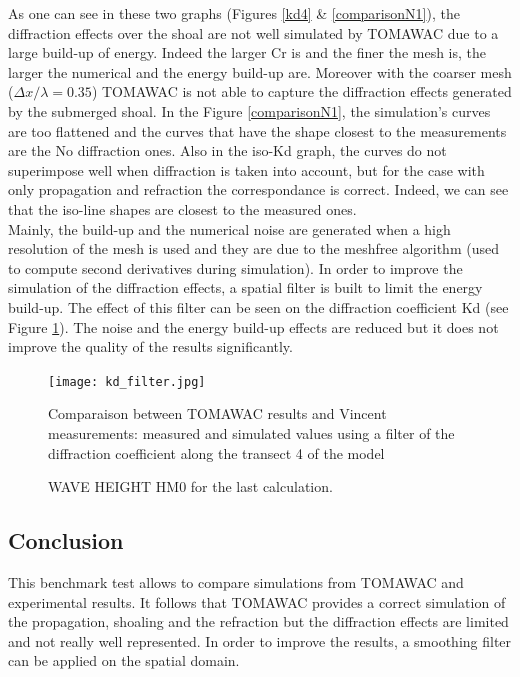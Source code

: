 As one can see in these two graphs (Figures \ref{kd4} \& \ref{comparisonN1}), the diffraction effects over the shoal are not well simulated by TOMAWAC due to a large build-up of energy. Indeed the larger Cr is and the finer the mesh is, the larger the numerical and the energy build-up are. Moreover with the coarser mesh ($\Delta x / \lambda = 0.35$) TOMAWAC is not able to capture the diffraction effects generated by the submerged shoal. In the Figure \ref{comparisonN1}, the simulation's curves are too flattened and the curves that have the shape closest to the measurements are the No diffraction ones. Also in the iso-Kd graph, the curves do not superimpose well when diffraction is taken into account, but for the case with only propagation and refraction the correspondance is correct. Indeed, we can see that the iso-line shapes are closest to the measured ones.\\
Mainly, the build-up and the numerical noise are generated when a high resolution of the mesh is used and they are due to the meshfree algorithm (used to compute second derivatives during simulation).
In order to improve the simulation of the diffraction effects, a spatial filter is built to limit the energy build-up. The effect of this filter can be seen on the diffraction coefficient Kd (see Figure \ref{kdfilter}). The noise and the energy build-up effects are reduced but it does not improve the quality of the results significantly.\\

\begin{figure}[H]
  \centering
    \texttt{[image: kd\_filter.jpg]}
      \caption{Comparaison between TOMAWAC results and Vincent measurements: measured and simulated values using a filter of the diffraction coefficient along the transect 4 of the model}
\label{kdfilter}
\end{figure}

\begin{figure}[H]
  \centering
      \caption{WAVE HEIGHT HM0 for the last calculation.}
\label{resultshoal}
\end{figure}

\subsection{Conclusion}
This benchmark test allows to compare simulations from TOMAWAC and experimental results. It follows that TOMAWAC provides a correct simulation of the propagation, shoaling and the refraction but the diffraction effects are limited and not really well represented. In order to improve the results, a smoothing filter can be applied on the spatial domain.\\
